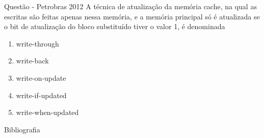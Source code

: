 \documentclass[aspectratio=169,
				xcolor=table]{beamer}
\begin{document}
	\begin{frame}{Questão - Petrobras 2012}
		A técnica de atualização da memória cache, na qual as escritas são feitas apenas nessa memória, e a memória principal só é atualizada se o bit de atualização do bloco substituído tiver o valor 1, é denominada
		
		\begin{enumerate}[a]
			\item write-through
			\item write-back
			\item write-on-update
			\item write-if-updated
			\item write-when-updated		
		\end{enumerate}



	\end{frame}	
	\begin{frame}{Bibliografia}
		\nocite{Englander2011}
		\nocite{Paixao2014}
		\nocite{Stallings2010}
    	
    	   	
	
	\end{frame}		
	
	\begin{frame}{}
	\end{frame}
\end{document}
